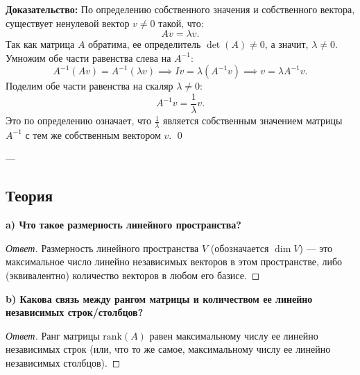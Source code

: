 \documentclass[11pt, a4paper]{article}
\begin{document}
\textbf{Доказательство:}
По определению собственного значения и собственного вектора, существует ненулевой вектор $v \ne 0$ такой, что:
$$ A v = \lambda v. $$
Так как матрица $A$ обратима, ее определитель $\det(A) \ne 0$, а значит, $\lambda \ne 0$.
Умножим обе части равенства слева на $A^{-1}$:
$$ A^{-1} (A v) = A^{-1} (\lambda v) \implies I v = \lambda (A^{-1} v) \implies v = \lambda A^{-1} v. $$
Поделим обе части равенства на скаляр $\lambda \ne 0$:
$$ A^{-1} v = \frac{1}{\lambda} v. $$
Это по определению означает, что $\frac{1}{\lambda}$ является собственным значением матрицы $A^{-1}$ с тем же собственным вектором $v$. \qed

---

\subsection*{Теория}

\textbf{a) Что такое размерность линейного пространства?}
\begin{proof}[Ответ]
Размерность линейного пространства $V$ (обозначается $\dim V$) --- это максимальное число линейно независимых векторов в этом пространстве, либо (эквивалентно) количество векторов в любом его базисе.
\end{proof}

\textbf{b) Какова связь между рангом матрицы и количеством ее линейно независимых строк/столбцов?}
\begin{proof}[Ответ]
Ранг матрицы $\text{rank}(A)$ равен максимальному числу ее линейно независимых строк (или, что то же самое, максимальному числу ее линейно независимых столбцов).
\end{proof}
\end{document}

